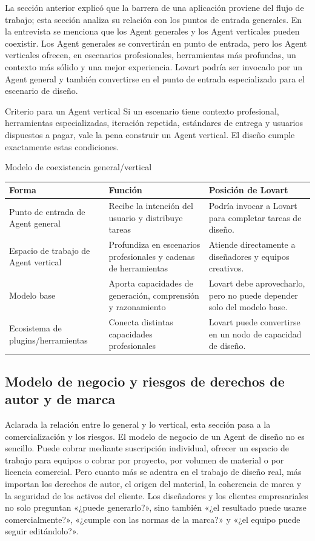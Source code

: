 \documentclass[a4paper]{article}
\begin{document}
La sección anterior explicó que la barrera de una aplicación proviene del flujo de trabajo; esta sección analiza su relación con los puntos de entrada generales. En la entrevista se menciona que los Agent generales y los Agent verticales pueden coexistir. Los Agent generales se convertirán en punto de entrada, pero los Agent verticales ofrecen, en escenarios profesionales, herramientas más profundas, un contexto más sólido y una mejor experiencia. Lovart podría ser invocado por un Agent general y también convertirse en el punto de entrada especializado para el escenario de diseño.

\begin{importantbox}{Criterio para un Agent vertical}
Si un escenario tiene contexto profesional, herramientas especializadas, iteración repetida, estándares de entrega y usuarios dispuestos a pagar, vale la pena construir un Agent vertical. El diseño cumple exactamente estas condiciones.
\end{importantbox}

\begin{knowledgebox}{Modelo de coexistencia general/vertical}
\begin{tabularx}{\textwidth}{p{}p{}X}
\toprule
Forma & Función & Posición de Lovart \\
\midrule
Punto de entrada de Agent general & Recibe la intención del usuario y distribuye tareas & Podría invocar a Lovart para completar tareas de diseño. \\
Espacio de trabajo de Agent vertical & Profundiza en escenarios profesionales y cadenas de herramientas & Atiende directamente a diseñadores y equipos creativos. \\
Modelo base & Aporta capacidades de generación, comprensión y razonamiento & Lovart debe aprovecharlo, pero no puede depender solo del modelo base. \\
Ecosistema de plugins/herramientas & Conecta distintas capacidades profesionales & Lovart puede convertirse en un nodo de capacidad de diseño. \\
\bottomrule
\end{tabularx}
\end{knowledgebox}

\subsection{Modelo de negocio y riesgos de derechos de autor y de marca}

Aclarada la relación entre lo general y lo vertical, esta sección pasa a la comercialización y los riesgos. El modelo de negocio de un Agent de diseño no es sencillo. Puede cobrar mediante suscripción individual, ofrecer un espacio de trabajo para equipos o cobrar por proyecto, por volumen de material o por licencia comercial. Pero cuanto más se adentra en el trabajo de diseño real, más importan los derechos de autor, el origen del material, la coherencia de marca y la seguridad de los activos del cliente. Los diseñadores y los clientes empresariales no solo preguntan «¿puede generarlo?», sino también «¿el resultado puede usarse comercialmente?», «¿cumple con las normas de la marca?» y «¿el equipo puede seguir editándolo?».
\end{document}
